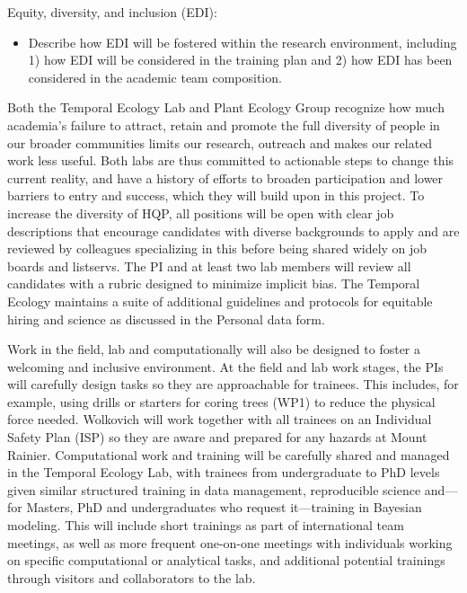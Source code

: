\documentclass[12pt,oneside]{article}
\newenvironment{smitemize}{
\begin{itemize}
  \setlength{\itemsep}{1pt}
  \setlength{\parskip}{0pt}
  \setlength{\parsep}{0pt}}
{\end{itemize}
}
\begin{document}
{\sc Equity, diversity, and inclusion (EDI):}  %
\vspace{-1ex}
\begin{smitemize}
\item  Describe how EDI will be fostered within the research environment, including 1) how EDI will be considered in the training plan and 2) how EDI has been considered in the academic team composition.
\end{smitemize}
Both the Temporal Ecology Lab and Plant Ecology Group recognize how much academia's failure to attract, retain and promote the full diversity of people in our broader communities limits our research, outreach and makes our related work less useful. Both labs are thus committed to actionable steps to change this current reality, and have a history of efforts to broaden participation and lower barriers to entry and success, which they will build upon in this project. To increase the diversity of HQP, all positions will be open with clear job descriptions that encourage candidates with diverse backgrounds to apply and are reviewed by colleagues specializing in this before being shared widely on job boards and listservs.  The PI and at least two lab members will review all candidates with a rubric designed to minimize implicit bias. The Temporal Ecology maintains a suite of additional guidelines and protocols for equitable hiring and science as discussed in the Personal data form. %

Work in the field, lab and computationally will also be designed to foster a welcoming and inclusive environment. At the field and lab work stages, the PIs will carefully design tasks so they are approachable for trainees. This includes, for example, using drills or starters for coring trees (WP1) to reduce the physical force needed.  Wolkovich will work together with all trainees on an Individual Safety Plan (ISP) so they are aware and prepared for any hazards at Mount Rainier.  Computational work and training will be carefully shared and managed in the Temporal Ecology Lab, with trainees from undergraduate to PhD levels given similar structured training in data management, reproducible science and---for Masters, PhD and undergraduates who request it---training in Bayesian modeling. This will include short trainings as part of international team meetings, as well as more frequent one-on-one meetings with individuals working on specific computational or analytical tasks, and additional potential trainings through visitors and collaborators to the lab. %
\end{document}
